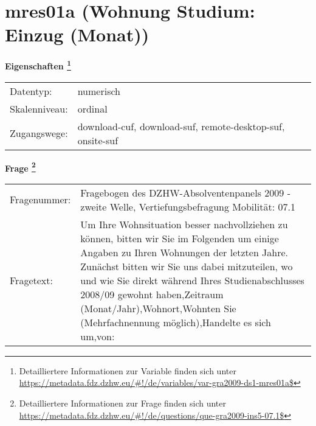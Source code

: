 
    \setcounter{footnote}{0}

    \vspace*{-1.8cm}
	\section{mres01a (Wohnung Studium: Einzug (Monat))}
	\label{section:mres01a}



    \vspace*{0.5cm}
    \noindent\textbf{Eigenschaften
	\footnote{Detailliertere Informationen zur Variable finden sich unter
		\url{https://metadata.fdz.dzhw.eu/\#!/de/variables/var-gra2009-ds1-mres01a$}}}\\
	\begin{tabularx}{\hsize}{@{}lX}
	Datentyp: & numerisch \\
	Skalenniveau: & ordinal \\
	Zugangswege: &
	  download-cuf, 
	  download-suf, 
	  remote-desktop-suf, 
	  onsite-suf
 \\
    \end{tabularx}



				\vspace*{0.5cm}
                \noindent\textbf{Frage
	                \footnote{Detailliertere Informationen zur Frage finden sich unter
		              \url{https://metadata.fdz.dzhw.eu/\#!/de/questions/que-gra2009-ins5-07.1$}}}\\
				\begin{tabularx}{\hsize}{@{}lX}
					Fragenummer: &
					  Fragebogen des DZHW-Absolventenpanels 2009 - zweite Welle, Vertiefungsbefragung Mobilität:
					  07.1
 \\
					Fragetext: & Um Ihre Wohnsituation besser nachvollziehen zu können, bitten wir Sie im Folgenden um einige Angaben zu Ihren Wohnungen der letzten Jahre. Zunächst bitten wir Sie uns dabei mitzuteilen, wo und wie Sie direkt während Ihres Studienabschlusses 2008/09 gewohnt haben,Zeitraum (Monat/Jahr),Wohnort,Wohnten Sie (Mehrfachnennung möglich),Handelte es sich um,von: \\
				\end{tabularx}






